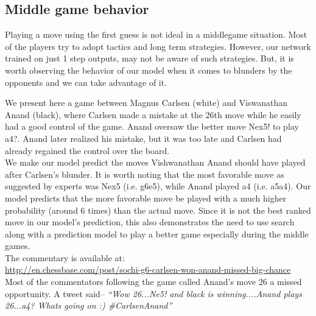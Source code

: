 \vfill
\subsection{Middle game behavior}
Playing a move using the first guess is not ideal in a middlegame situation. 
Most of the players try to adopt tactics and long term strategies. However, our 
network trained on just 1 step outputs, may not be aware of such strategies. 
But, it is worth observing the behavior of our model when it comes to blunders 
by the opponents and we can take advantage of it.

We present here a game between Magnus Carlsen (white) and Viswanathan Anand 
(black), where Carlsen made a mistake at the 26th move while he easily had a 
good control of the game. Anand oversaw the better move Nex5! to play a4?. Anand 
later realized his mistake, but it was too late and Carlsen had already regained 
the control over the board.\\

We make our model predict the moves Vishwanathan 
Anand should have played after Carlsen's blunder. It is worth noting that the 
most favorable move as suggested by experts was Nex5 (i.e. g6e5), while Anand 
played a4 (i.e. a5a4). Our model predicts that the more favorable move be played 
with a much higher probability (around 6 times) than the actual move. Since 
it is not the best ranked move in our model's prediction, this also 
demonstrates the need to use search along with a prediction model to play a 
better game especially during the middle games. \\

The commentary is available at: \\
\url{http://en.chessbase.com/post/sochi-g6-carlsen-won-anand-missed-big-chance}
Most of the commentators following the game called Anand's move 26 a missed 
opportunity. A tweet said-- \textit{``Wow 26...Ne5! and black is 
winning....Anand plays 26...a4? Whats going on :) \#CarlsenAnand''}

